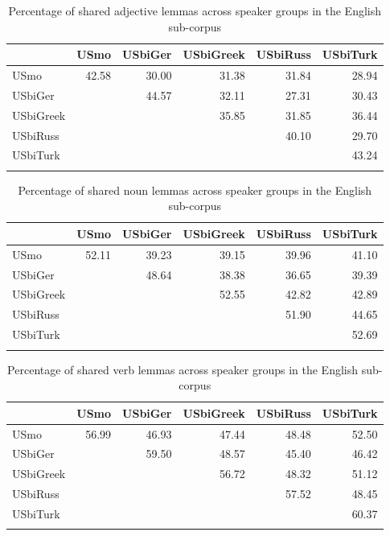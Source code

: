 \documentclass[output=paper,colorlinks,citecolor=brown]{langscibook}
\begin{document}
\begin{table}
\caption{Percentage of shared adjective lemmas across speaker groups in the English sub-corpus}
\begin{tabularx}{\textwidth}{Qrrrrr}
\lsptoprule
~ & USmo & USbiGer & USbiGreek & USbiRuss & USbiTurk\\\midrule
USmo &  42.58 & 30.00 & 31.38 & 31.84 & 28.94\\
USbiGer & ~ &  44.57 & 32.11 & 27.31 & 30.43\\
USbiGreek & ~ & ~ &  35.85 & 31.85 & 36.44\\
USbiRuss & ~ & ~ & ~ &  40.10 & 29.70\\
USbiTurk & ~ & ~ & ~ & ~ &  43.24 \\
\lspbottomrule
\end{tabularx}
\label{tab:kelleretal:ADJ_Kable_TriangleMatrix_EN}
\end{table}

\begin{table}
\caption{Percentage of shared noun lemmas across speaker groups in the English sub-corpus}
\centering
\begin{tabularx}{\textwidth}{Qrrrrr}
\lsptoprule
~ & USmo & USbiGer & USbiGreek & USbiRuss & USbiTurk\\\midrule
USmo &  52.11 & 39.23 & 39.15 & 39.96 & 41.10\\
USbiGer & ~ &  48.64 & 38.38 & 36.65 & 39.39\\
USbiGreek & ~ & ~ &  52.55 & 42.82 & 42.89\\
USbiRuss & ~ & ~ & ~ &  51.90 & 44.65\\
USbiTurk & ~ & ~ & ~ & ~ &  52.69 \\
\lspbottomrule
\end{tabularx}
\label{tab:kelleretal:NOUN_Kable_TriangleMatrix_EN}
\end{table}
\clearpage
\begin{table}[t]
\caption{Percentage of shared verb lemmas across speaker groups in the English sub-corpus}
\centering
\begin{tabularx}{\textwidth}{Qrrrrr}
\lsptoprule
~ & USmo & USbiGer & USbiGreek & USbiRuss & USbiTurk\\\midrule
USmo &  56.99 & 46.93 & 47.44 & 48.48 & 52.50\\
USbiGer & ~ &  59.50 & 48.57 & 45.40 & 46.42\\
USbiGreek & ~ & ~ &  56.72 & 48.32 & 51.12\\
USbiRuss & ~ & ~ & ~ &  57.52 & 48.45\\
USbiTurk & ~ & ~ & ~ & ~ &  60.37 \\
\lspbottomrule
\end{tabularx}
\label{tab:kelleretal:VERB_Kable_TriangleMatrix_EN}
\end{table}

\printbibliography[heading=subbibliography,notkeyword=this]
\end{document}
